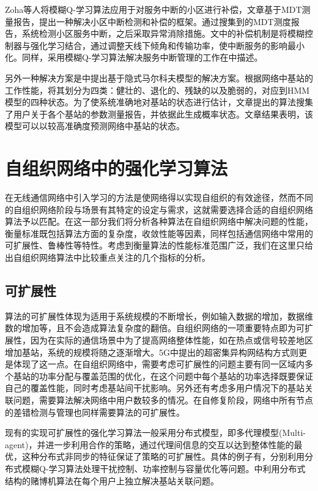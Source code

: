 \documentclass{IEEEtran}
\begin{document}
Zoha等人\cite{Zoha2016}将模糊Q-学习算法应用于对服务中断的小区进行补偿，文章基于MDT测量报告，提出一种解决小区中断检测和补偿的框架。通过搜集到的MDT测度报告，系统检测小区服务中断，之后采取异常消除措施。文中的补偿机制是将模糊控制器与强化学习结合，通过调整天线下倾角和传输功率，使中断服务的影响最小化。同样，采用模糊Q-学习算法解决服务中断管理的工作在\cite{Razavi2010}\cite{Razavi2010a}\cite{Islam2012}中描述。

另外一种解决方案是\cite{Alias2016}中提出基于隐式马尔科夫模型的解决方案。根据网络中基站的工作性能，将其划分为四类：健壮的、退化的、残缺的以及脆弱的，对应到HMM模型的四种状态。为了使系统准确地对基站的状态进行估计，文章提出的算法搜集了用户关于各个基站的参数测量报告，并依据此生成概率状态。文章结果表明，该模型可以以较高准确度预测网络中基站的状态。

\section{自组织网络中的强化学习算法}
\label{sec:Compare}
在无线通信网络中引入学习的方法是使网络得以实现自组织的有效途径，然而不同的自组织网络阶段与场景有其特定的设定与需求，这就需要选择合适的自组织网络算法予以匹配。在这一部分我们将分析各种算法在自组织网络中解决问题的性能，衡量标准既包括算法方面的复杂度，收敛性能等因素，同样包括通信网络中常用的可扩展性、鲁棒性等特性。考虑到衡量算法的性能标准范围广泛，我们在这里只给出自组织网络算法中比较重点关注的几个指标的分析。
\subsection{可扩展性}
算法的可扩展性体现为适用于系统规模的不断增长，例如输入数据的增加，数据维数的增加等，且不会造成算法复杂度的翻倍。自组织网络的一项重要特点即为可扩展性，因为在实际的通信场景中为了提高网络整体性能，如在热点或信号较差地区增加基站，系统的规模将随之逐渐增大。5G中提出的超密集异构网结构方式则更是体现了这一点。在自组织网络中，需要考虑可扩展性的问题主要有同一区域内多个基站的功率分配与覆盖范围的优化，在这个问题中每个基站的功率选择既要保证自己的覆盖性能，同时考虑基站间干扰影响。另外还有考虑多用户情况下的基站关联问题，需要算法解决网络中用户数较多的情况。在自修复阶段，网络中所有节点的差错检测与管理也同样需要算法的可扩展性。

现有的实现可扩展性的强化学习算法一般采用分布式模型，即多代理模型(Multi-agent)，并进一步利用合作的策略，通过代理间信息的交互以达到整体性能的最优，这种分布式非同步的特征保证了策略的可扩展性。具体的例子有\cite{Dirani2010}\cite{Fan2014}\cite{Islam2012}，分别利用分布式模糊Q-学习算法处理干扰控制、功率控制与容量优化等问题。\cite{Maghsudi2017}中利用分布式结构的赌博机算法在每个用户上独立解决基站关联问题。
\end{document}

